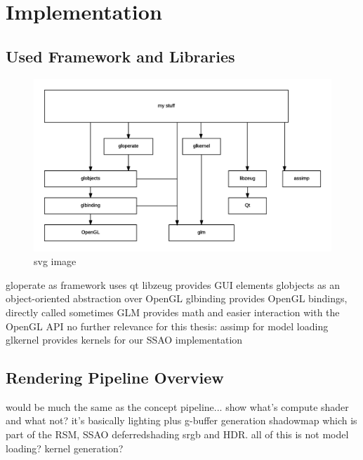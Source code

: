 

\chapter{Implementation}

\section{Used Framework and Libraries}

\begin{figure}[htbp]
  \centering
  \includegraphics{graphics/Architecture}
  \caption{svg image}
\end{figure}

\begin{outline}
\1 gloperate as framework
    \2 uses qt
\1 libzeug provides GUI elements
\1 globjects as an object-oriented abstraction over OpenGL
\1 glbinding provides OpenGL bindings, directly called sometimes
\1 GLM provides math and easier interaction with the OpenGL API
\1 no further relevance for this thesis:
    \2 assimp for model loading
    \2 glkernel provides kernels for our SSAO implementation
\end{outline}

\section{Rendering Pipeline Overview}
\begin{outline}
\1 would be much the same as the concept pipeline...
\1 show what's compute shader and what not?
\1 it's basically lighting plus
    \2 g-buffer generation
    \2 shadowmap which is part of the RSM,
    \2 SSAO
    \2 deferredshading
    \2 srgb and HDR.
    \2 all of this is not
\1 model loading?
\1 kernel generation?
\end{outline}


